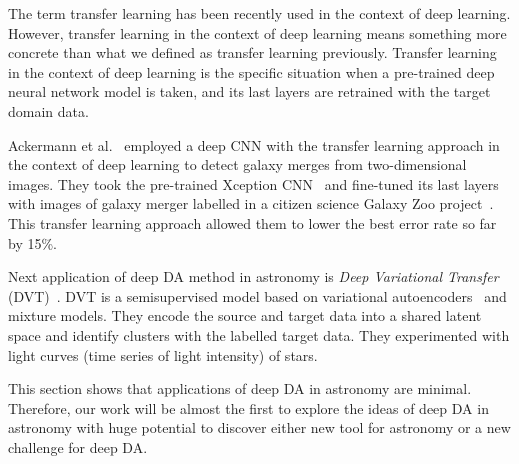 The term transfer learning has been recently used in the context of deep learning.
However, transfer learning in the context of deep learning means something more concrete than what we defined as transfer learning previously.
Transfer learning in the context of deep learning is the specific situation
when a pre-trained deep neural network model is taken,
and its last layers are retrained with the target domain data.

Ackermann et al.~\cite{ackermann2018} employed a deep CNN
with the transfer learning approach
in the context of deep learning to detect galaxy merges
from two-dimensional images.
They took the pre-trained Xception CNN~\cite{chollet2017}
and fine-tuned its last layers with images of galaxy merger labelled
in a citizen science Galaxy Zoo project~\cite{lintott2010}.
This transfer learning approach allowed them to lower the best error rate so far by 15\%.

Next application of deep DA method in astronomy is \textit{Deep Variational Transfer} (DVT)~\cite{belhaj2018}.
DVT is a semisupervised model based on variational autoencoders~\cite{kingma2014a} and mixture models.
They encode the source and target data into a shared latent space
and identify clusters with the labelled target data.
They experimented with light curves (time series of light intensity) of stars.

This section shows that applications of deep DA in astronomy are minimal.
Therefore, our work will be almost the first to explore the ideas
of deep DA in astronomy with huge potential to discover
either new tool for astronomy or a new challenge for deep DA.
